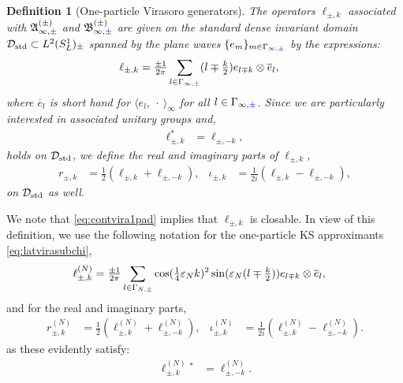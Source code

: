 \documentclass[a4paper, 11pt]{article}
\newcommand{\fA}{\mathfrak{A}}\newcommand{\cA}{\mathcal{A}}\newcommand{\dA}{\mathds{A}}\newcommand{\sA}{\mathscr{A}}
\newcommand{\fB}{\mathfrak{B}}\newcommand{\cB}{\mathcal{B}}\newcommand{\dB}{\mathds{B}}\newcommand{\sB}{\mathscr{B}}
\DeclareMathOperator{\1}{\mathds{1}}
\DeclareMathOperator{\std}{std}
\newtheorem{defn}[thm]{Definition}
\begin{document}
\begin{defn}[One-particle Virasoro generators]
\label{def:vir}
The operators $\ell_{\pm,k}$ associated with $\fA^{(\pm)}_{\infty,{\color{blue}\pm}}$ and $\fB^{(\pm)}_{\infty,{\color{blue}\pm}}$ are given on the standard dense invariant domain $\cD_{\std}\subset L^{2}(S^{1}_{L})_{{\color{blue}\pm}}$ spanned by the plane waves $\{e_{m}\}_{m\in\Gamma_{\infty,{\color{blue}\pm}}}$ by the expressions:
\begin{align}
\label{eq:contvira1p}
\ell_{\pm,k} & = \tfrac{\pm1}{2\pi}\sum_{l\in\Gamma_{\infty,{\color{blue}\pm}}}(l\mp\tfrac{k}{2})e_{l\mp k}\otimes \overline{e}_{l},
\end{align}
where $\overline{e}_{l}$ is short hand for $\langle e_{l},\!\ \cdot\!\ \rangle_{\infty}$ for all $l\in\Gamma_{\infty,{\color{blue}\pm}}$. Since we are particularly interested in associated unitary groups and,
\begin{align}
\label{eq:contvira1pad}
\ell_{\pm,k}^{*} & = \ell_{\pm,-k},
\end{align}
holds on $\cD_{\std}$, we define the real and imaginary parts of $\ell_{\pm,k}$,
\begin{align}
\label{eq:contvira1pRI}
r_{\pm,k} & = \tfrac{1}{2}(\ell_{\pm,k}+\ell_{\pm,-k}), & \iota_{\pm,k} & = \tfrac{1}{2i}(\ell_{\pm,k}-\ell_{\pm,-k}),
\end{align}
on $\cD_{\std}$ as well.
\end{defn}
We note that \eqref{eq:contvira1pad} implies that $\ell_{\pm,k}$ is closable. In view of this definition, we use the following notation for the one-particle KS approximants \eqref{eq:latvirasubchi},
\begin{align}
\label{eq:latvira1p}
\ell^{(N)}_{\pm,k} & = \tfrac{\pm1}{2\pi}\sum_{l\in\Gamma_{N,{\color{blue}\pm}}}\cos(\tfrac{1}{4}\varepsilon_{N}k)^{2}\sin(\varepsilon_{N}(l\mp\tfrac{k}{2}))e_{l\mp k}\otimes \overline{e}_{l},
\end{align}
and for the real and imaginary parts,
\begin{align}
\label{eq:latvira1pRI}
r^{(N)}_{\pm,k} & = \tfrac{1}{2}(\ell^{(N)}_{\pm,k}+\ell^{(N)}_{\pm,-k}), & \iota^{(N)}_{\pm,k} & = \tfrac{1}{2i}(\ell^{(N)}_{\pm,k}-\ell^{(N)}_{\pm,-k}).
\end{align}
as these evidently satisfy:
\begin{align}
\label{eq:latvira1pad}
\ell^{(N)}_{\pm,k}{}^{*} & = \ell^{(N)}_{\pm,-k}.
\end{align}
\end{document}
